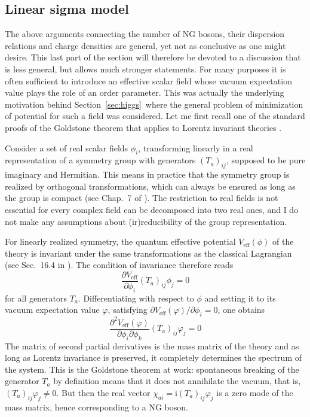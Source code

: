 \documentclass[final,2p,times,12pt,sort&compress]{elsarticle}
\newcommand\imag{\mathrm i}                 %
\newcommand\de{\partial}
\newcommand\vp{\varphi}
\newcommand\Pd[2]{\partial #1/\partial #2}  %
\newcommand\PD[2]{\frac{\partial #1}{\partial #2}} %
\begin{document}
\subsection{Linear sigma model}
\label{subsec:lsm}
The above arguments connecting the number of NG bosons, their dispersion
relations and charge densities are general, yet not as conclusive as one might
desire. This last part of the section will therefore be devoted to a discussion
that is less general, but allows much stronger statements. For many purposes it
is often sufficient to introduce an effective scalar field whose vacuum
expectation value plays the role of an order parameter. This was actually the
underlying motivation behind Section~\ref{sec:higgs}\ where the general problem
of minimization of potential for such a field was considered. Let me first
recall one of the standard proofs of the Goldstone theorem that applies to
Lorentz invariant theories \cite{Goldstone:1962es}.

Consider a set of real scalar fields $\phi_i$, transforming linearly in a real
representation of a symmetry group with generators $(T_a)_{ij}$, supposed to be
pure imaginary and Hermitian. This means in practice that the symmetry group is
realized by orthogonal transformations, which can always be ensured as long as
the group is compact (see Chap.~7 of \cite{Barut:1977ba}). The restriction to
real fields is not essential for every complex field can be decomposed into two
real ones, and I do not make any assumptions about (ir)reducibility of the group
representation.

For linearly realized symmetry, the quantum effective potential
$V_{\text{eff}}(\phi)$ of the theory is invariant under the same transformations
as the classical Lagrangian (see Sec.~16.4 in \cite{Weinberg:1996v2}). The
condition of invariance therefore reads
\begin{equation}
\PD{V_{\text{eff}}}{\phi_i}(T_a)_{ij}\phi_j=0
\end{equation}
for all generators $T_a$. Differentiating with respect to $\phi$ and setting it
to its vacuum expectation value $\vp$, satisfying
$\Pd{V_{\text{eff}}(\vp)}{\phi_i}=0$, one obtains
\begin{equation}
\frac{\de^2V_{\text{eff}}(\vp)}{\de\phi_i\de\phi_k}(T_a)_{ij}\vp_j=0
\end{equation}
The matrix of second partial derivatives is the mass matrix of the theory and
as long as Lorentz invariance is preserved, it completely determines the
spectrum of the system. This is the Goldstone theorem at work: spontaneous
breaking of the generator $T_a$ by definition means that it does not annihilate
the vacuum, that is, $(T_a)_{ij}\vp_j\neq0$. But then the real vector
$\chi_{ai}=\imag(T_a)_{ij}\vp_j$ is a zero mode of the mass matrix, hence
corresponding to a NG boson.
\end{document}
